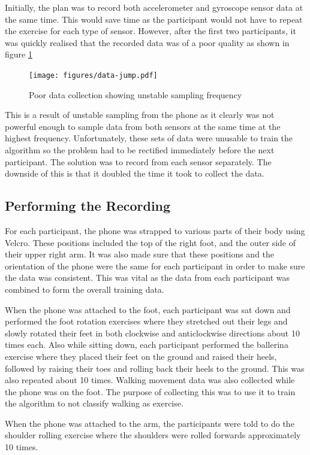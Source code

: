 Initially, the plan was to record both accelerometer and gyroscope sensor data at the same time. This would save time as the participant would not have to repeat the exercise for each type of sensor. However, after the first two participants, it was quickly realised that the recorded data was of a poor quality as shown in figure \ref{fig:bad-data}

\begin{figure}
	\centering
	\texttt{[image: figures/data-jump.pdf]}
	\caption{Poor data collection showing unstable sampling frequency\label{fig:bad-data}}
\end{figure}

This is a result of unstable sampling from the phone as it clearly was not powerful enough to sample data from both sensors at the same time at the highest frequency. Unfortunately, these sets of data were unusable to train the algorithm so the problem had to be rectified immediately before the next participant. The solution was to record from each sensor separately. The downside of this is that it doubled the time it took to collect the data.

\subsection{Performing the Recording}
For each participant, the phone was strapped to various parts of their body using Velcro. These positions included the top of the right foot, and the outer side of their upper right arm. It was also made sure that these positions and the orientation of the phone were the same for each participant in order to make sure the data was consistent. This was vital as the data from each participant was combined to form the overall training data.

When the phone was attached to the foot, each participant was sat down and performed the foot rotation exercises where they stretched out their legs and slowly rotated their feet in both clockwise and anticlockwise directions about 10 times each. Also while sitting down, each participant performed the ballerina exercise where they placed their feet on the ground and raised their heels, followed by raising their toes and rolling back their heels to the ground. This was also repeated about 10 times. Walking movement data was also collected while the phone was on the foot. The purpose of collecting this was to use it to train the algorithm to not classify walking as exercise.

When the phone was attached to the arm, the participants were told to do the shoulder rolling exercise where the shoulders were rolled forwards approximately 10 times.

